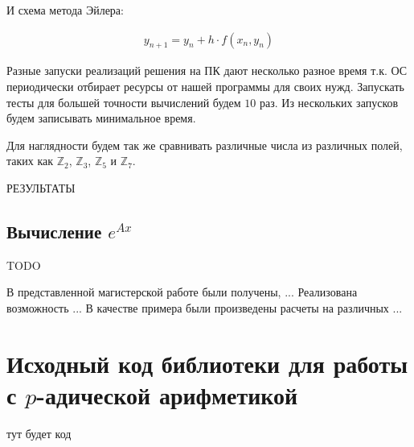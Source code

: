 \documentclass[master, och, diploma, times]{sty/SCWorks}
\theoremstyle{plain}
\theoremstyle{definition}
\begin{document}
\noindent И схема метода Эйлера:

\begin{equation}%
\begin{aligned}
y_{n+1}=y_n+h \cdot f(x_n, y_n)
\end{aligned}
\end{equation}

Разные запуски реализаций решения на ПК дают несколько разное время т.к. ОС периодически отбирает ресурсы от нашей программы для своих нужд. Запускать тесты для большей точности вычислений будем $10$ раз. Из нескольких запусков будем записывать минимальное время.

Для наглядности будем так же сравнивать различные числа из различных полей, таких как $\mathbb{Z}_2$, $\mathbb{Z}_3$, $\mathbb{Z}_5$ и $\mathbb{Z}_7$.



РЕЗУЛЬТАТЫ



\subsection{Вычисление $e^{Ax}$}

TODO
 

\conclusion
В представленной магистерской работе были получены, ...
Реализована возможность ...
В качестве примера были произведены расчеты на различных ...




\appendix

\section{Исходный код библиотеки для работы с $p$-адической арифметикой}

тут будет код
\end{document}
